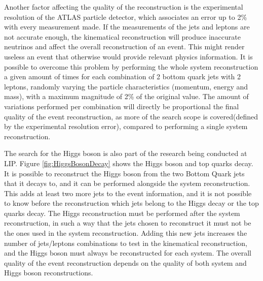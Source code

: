 Another factor affecting the quality of the reconstruction is the experimental resolution of the ATLAS particle detector, which associates an error up to 2\% with every measurement made. If the measurements of the jets and leptons are not accurate enough, the kinematical reconstruction will produce inaccurate neutrinos and affect the overall reconstruction of an event. This might render useless an event that otherwise would provide relevant physics information. It is possible to overcome this problem by performing the whole \ttbar system reconstruction a given amount of times for each combination of 2 bottom quark jets with 2 leptons, randomly varying the particle characteristics (momentum, energy and mass), with a maximum magnitude of 2\% of the original value. The amount of variations performed per combination will directly be proportional the final quality of the event reconstruction, as more of the search scope is covered(defined by the experimental resolution error), compared to performing a single \ttbar system reconstruction.

The search for the Higgs boson is also part of the research being conducted at LIP. Figure \ref{fig:HiggsBosonDecay} shows the Higgs boson and top quarks decay. It is possible to reconstruct the Higgs boson from the two Bottom Quark jets that it decays to, and it can be performed alongside the \ttbar system reconstruction. This adds at least two more jets to the event information, and it is not possible to know before the reconstruction which jets belong to the Higgs decay or the top quarks decay. The Higgs reconstruction must be performed after the \ttbar system reconstruction, in such a way that the jets chosen to reconstruct it must not be the ones used in the \ttbar system reconstruction. Adding this new jets increases the number of jets/leptons combinations to test in the kinematical reconstruction, and the Higgs boson must always be reconstructed for each \ttbar system. The overall quality of the event reconstruction depends on the quality of both \ttbar system and Higgs boson reconstructions.

